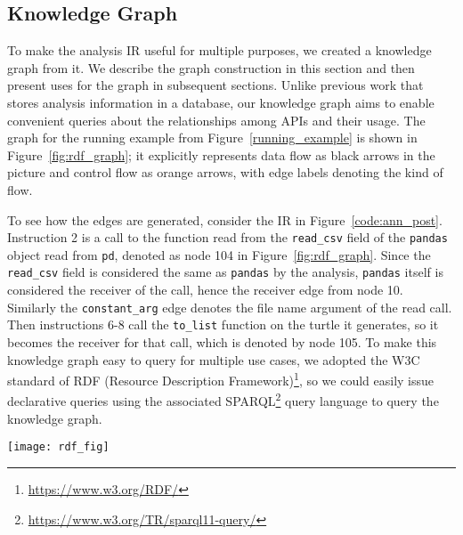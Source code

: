 \subsection{Knowledge Graph}
\label{sec:graph}

To make the analysis IR useful for multiple purposes, we created a knowledge graph from it.  We describe the graph construction in this section and then present uses for the graph in subsequent sections.  Unlike previous work that stores analysis information in a database, our knowledge graph aims to enable convenient queries about the relationships among APIs and their usage.  The graph for the running example from Figure~\ref{running_example} is shown in Figure~\ref{fig:rdf_graph}; it explicitly represents data flow as black arrows in the picture and control flow as orange arrows, with edge labels denoting the kind of flow.

 To see how the edges are generated, consider the IR in Figure~\ref{code:ann_post}.  Instruction 2 is a call to the function read from the {\tt read\_csv} field of the {\tt pandas} object read from {\tt pd}, denoted as node 104 in Figure~\ref{fig:rdf_graph}.  Since the {\tt read\_csv} field is considered the same as {\tt pandas} by the analysis, {\tt pandas} itself is considered the receiver of the call, hence the receiver edge from node 10.  Similarly the {\tt constant\_arg} edge denotes the file name argument of the read call.  Then instructions 6-8 call the {\tt to\_list} function on the turtle it generates, so it becomes the receiver for that call, which is denoted by node 105.  To make this knowledge graph easy to query for multiple use cases, we adopted the W3C standard of RDF (Resource Description Framework)\footnote{\url{https://www.w3.org/RDF/}}, so we could easily issue declarative queries using the associated SPARQL\footnote{\url{https://www.w3.org/TR/sparql11-query/}} query language to query the knowledge graph. 

\begin{figure*}[htb]
\begin{center}
\texttt{[image: rdf\_fig]}
\end{center}
\caption{RDF representation of turtles in running example}
\label{fig:rdf_graph}
\end{figure*}
